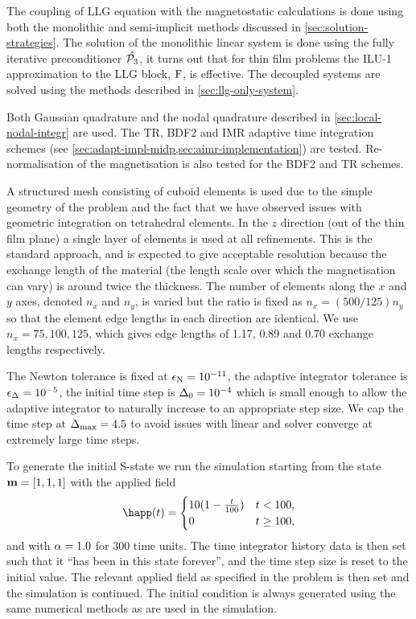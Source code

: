 The coupling of LLG equation with the magnetostatic calculations is done using both the monolithic and semi-implicit methods discussed in \cref{sec:solution-strategies}.
The solution of the monolithic linear system is done using the fully iterative preconditioner $\hat{\mathcal{P}_3}$, it turns out that for thin film problems the ILU-1 approximation to the LLG block, $\mathrm{F}$, is effective.
The decoupled systems are solved using the methods described in \cref{sec:llg-only-system}.

Both Gaussian quadrature and the nodal quadrature described in \cref{sec:local-nodal-integr} are used.
The TR, BDF2 and IMR adaptive time integration schemes (see \cref{sec:adapt-impl-midp,sec:aimr-implementation}) are tested.
Re-normalisation of the magnetisation is also tested for the BDF2 and TR schemes.


A structured mesh consisting of cuboid elements is used due to the simple geometry of the problem and the fact that we have observed issues with geometric integration on tetrahedral elements.
In the $z$ direction (out of the thin film plane) a single layer of elements is used at all refinements.
This is the standard approach, and is expected to give acceptable resolution because the exchange length of the material (the length scale over which the magnetisation can vary) is around twice the thickness.
The number of elements along the $x$ and $y$ axes, denoted $n_x$ and $n_y$, is varied but the ratio is fixed as $n_x = (500/125) n_y$ so that the element edge lengths in each direction are identical.
We use $n_x=75,100,125$, which gives edge lengths of 1.17, 0.89 and 0.70 exchange lengths respectively.

The Newton tolerance is fixed at $\epsilon_{\mathrm{N}} = 10^{-11}$, the adaptive integrator tolerance is $\epsilon_{\Delta_{}} = 10^{-5}$, the initial time step is $\Delta_{0} = 10^{-4}$ which is small enough to allow the adaptive integrator to naturally increase to an appropriate step size.
We cap the time step at $\Delta_{\text{max}} = 4.5$ to avoid issues with linear and solver converge at extremely large time steps.


To generate the initial S-state we run the simulation starting from the state $\boldsymbol{\mathrm{m}}=[1,1,1]$ with the applied field
\begin{equation}
  \happ(t) =
  \begin{cases}
    10 (1- \frac{t}{100}) & t < 100, \\
    0 & t \geq 100,
  \end{cases}
\end{equation}
and with $\alpha = 1.0$ for 300 time units.
The time integrator history data is then set such that it ``has been in this state forever'', and the time step size is reset to the initial value.
The relevant applied field as specified in the problem is then set and the simulation is continued.
The initial condition is always generated using the same numerical methods as are used in the simulation.

